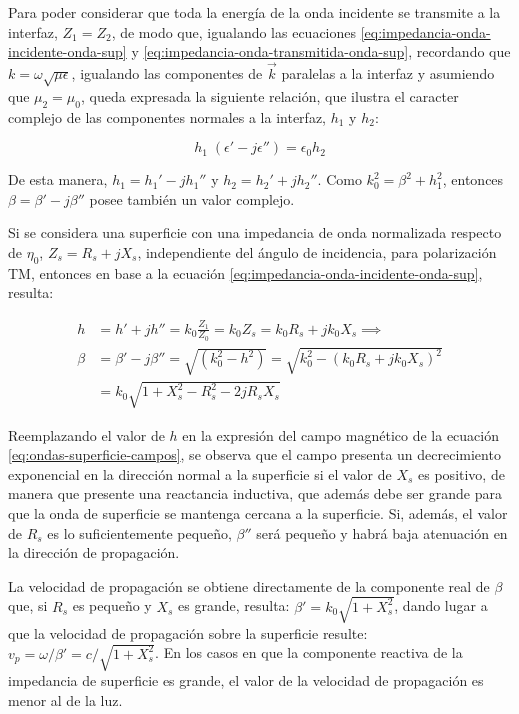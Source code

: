 Para poder considerar que toda la energía de la onda incidente se transmite a la interfaz, $Z_1 = Z_2$, de modo que, igualando las ecuaciones \ref{eq:impedancia-onda-incidente-onda-sup} y \ref{eq:impedancia-onda-transmitida-onda-sup}, recordando que $k = \omega \sqrt{\mu \epsilon}$, igualando las componentes de $\vec{k}$ paralelas a la interfaz y asumiendo que $\mu_2 = \mu_0$, queda expresada la siguiente relación, que ilustra el caracter complejo de las componentes normales a la interfaz, $h_1$ y $h_2$:

\begin{equation}
	h_1\; (\epsilon' - j \epsilon'') = \epsilon_0 h_2
\end{equation}

De esta manera, $h_1 = h_1' - jh_1''$ y $h_2 = h_2' + jh_2''$. Como $k_0^2 = \beta^2 + h_1^2$, entonces $\beta = \beta' - j \beta''$ posee también un valor complejo.

Si se considera una superficie con una impedancia de onda normalizada respecto de $\eta_0$, $Z_s = R_s + j X_s$, independiente del ángulo de incidencia, para polarización TM, entonces en base a la ecuación \ref{eq:impedancia-onda-incidente-onda-sup}, resulta:

\begin{align}
	h &= h'+jh'' = k_0 \frac{Z_1}{Z_0} = k_0 Z_s = k_0 R_s + j k_0 X_s \implies \\
	\beta &= \beta' - j\beta'' = \sqrt{(k_0^2 - h^2)} = \sqrt{k_0^2 - (k_0 R_s + j k_0 X_s )^2} \nonumber\\
		&= k_0 \sqrt{1+X_s^2 - R_s^2 - 2jR_s X_s} 
\end{align}

Reemplazando el valor de $h$ en la expresión del campo magnético de la ecuación \ref{eq:ondas-superficie-campos}, se observa que el campo presenta un decrecimiento exponencial en la dirección normal a la superficie si el valor de $X_s$ es positivo, de manera que presente una reactancia inductiva, que además debe ser grande para que la onda de superficie se mantenga cercana a la superficie. Si, además, el valor de $R_s$ es lo suficientemente pequeño, $\beta''$ será pequeño y habrá baja atenuación en la dirección de propagación.

La velocidad de propagación se obtiene directamente de la componente real de $\beta$ que, si $R_s$ es pequeño y $X_s$ es grande, resulta: $\beta' = k_0 \sqrt{1+X_s^2}$, dando lugar a que la velocidad de propagación sobre la superficie resulte: $v_p = \omega/\beta' = c / \sqrt{1+X_s^2}$. En los casos en que la componente reactiva de la impedancia de superficie es grande, el valor de la velocidad de propagación es menor al de la luz.

